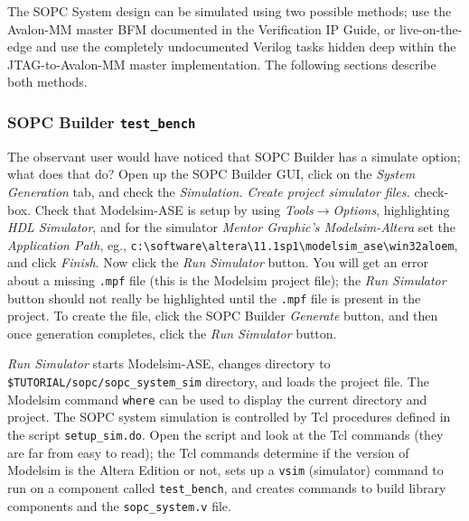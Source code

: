 \documentclass[10pt,twoside]{article}
\begin{document}
The SOPC System design can be simulated using two possible methods;
use the Avalon-MM master BFM documented in the Verification IP
Guide, or live-on-the-edge and use the completely undocumented
Verilog tasks hidden deep within the JTAG-to-Avalon-MM master 
implementation. The following sections describe both methods.

\subsubsection{SOPC Builder {\tt test\_bench}}
\label{sec:sopc_system_test_bench}

The observant user would have noticed that SOPC Builder has a simulate
option; what does that do? Open up the SOPC Builder GUI, click
on the {\em System Generation} tab, and check the {\em Simulation.
Create project simulator files.} check-box. Check that Modelsim-ASE
is setup by using {\em Tools$\rightarrow$Options},
highlighting {\em HDL Simulator}, and for the simulator
{\em Mentor Graphic's Modelsim-Altera} set the {\em Application Path},
eg., \verb+c:\software\altera\11.1sp1\modelsim_ase\win32aloem+,
and click {\em Finish}. Now click the {\em Run Simulator} button.
You will get an error about a missing \verb+.mpf+ file (this is
the Modelsim project file); the {\em Run Simulator} button should
not really be highlighted until the \verb+.mpf+ file is
present in the project\label{bug:3}. To create the file, 
click the SOPC Builder {\em Generate} button, and then once 
generation completes, click the {\em Run Simulator} button. 

{\em Run Simulator} starts Modelsim-ASE, 
changes directory to \verb+$TUTORIAL/sopc/sopc_system_sim+ directory, and
loads the project file. The Modelsim command \verb+where+ can be
used to display the current directory and project.
The SOPC system simulation is controlled by Tcl procedures defined
in the script \verb+setup_sim.do+. Open the script and look at
the Tcl commands (they are far from easy to read); the Tcl commands
determine if the version of Modelsim is the Altera Edition or not, sets up a 
\verb+vsim+ (simulator) command to run on a component 
called \verb+test_bench+, and creates commands to build library 
components and the \verb+sopc_system.v+ file. 
\end{document}
